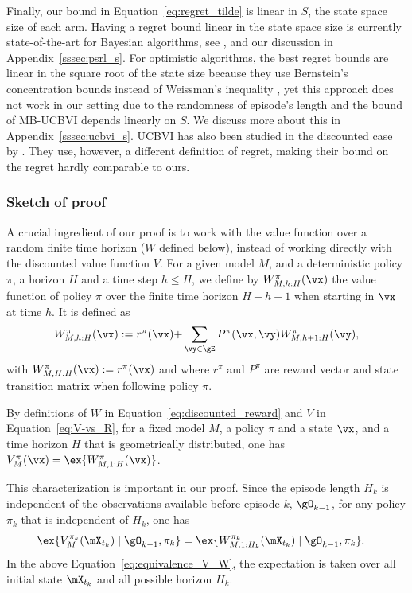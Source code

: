 Finally, our bound in Equation~\eqref{eq:regret_tilde} is linear in $S$, the state space size of each arm. Having a regret bound linear in the state space size is currently state-of-the-art for Bayesian algorithms, see \eg, \cite{agrawal2017posterior,ouyang2017learning} and our discussion in Appendix~\ref{sssec:psrl_s}. For optimistic algorithms, the best regret bounds are linear in the square root of the state size because they use  Bernstein's concentration bounds instead of Weissman's inequality \cite{azar2017minimax}, yet this approach does not work in our setting due to the randomness of episode's length and the bound of MB-UCBVI depends linearly on $S$. We discuss more about this in Appendix~\ref{sssec:ucbvi_s}. UCBVI has also been studied in the discounted case by \cite{zhou2021nearly}. They use, however, a different definition of regret, making their bound on the regret hardly comparable to ours.

\subsubsection*{Sketch of proof}
A crucial ingredient of our proof is to work with the value function over a random finite time horizon ($W$ defined below), instead of working directly with the discounted value function $V$. For a given model $M$, and a deterministic policy $\pi$, a horizon $H$ and a time step $h\le H$, we define by $W_{M,{h:H}}^\pi(\vx)$ the value function of policy $\pi$ over the finite time horizon ${H-h+1}$ when starting in $\vx$ at time $h$. It is defined as
\begin{equation}
    \label{eq:discounted_reward}
    W_{M,{h:H}}^\pi(\vx)  :=  r^\pi(\vx) {+}\sum_{\vy\in\gE}P^\pi(\vx,\vy)W_{M,{h+1:H}}^\pi(\vy),
\end{equation}
with $W_{M,{H:H}}^\pi(\vx):=r^\pi(\vx)$ and where $r^\pi$ and $P^\pi$ are reward vector and state transition matrix when following policy $\pi$.

By definitions of $W$ in Equation~\eqref{eq:discounted_reward} and $V$ in Equation~\eqref{eq:V-vs_R}, for a fixed model $M$, a policy $\pi$ and a state $\vx$, and a time horizon $H$ that is geometrically distributed, one has $V^{\pi}_M(\vx)=\ex{W_{M,1:H}^\pi(\vx)}$.

This characterization is important in our proof. Since the episode length $H_k$ is independent of the observations available before episode $k$, $\gO_{k-1}$, for any policy $\pi_k$ that is independent of $H_k$, one has
\begin{align}
    \ex{V^{\pi_k}_M(\mX_{t_k}) \mid {\gO_{k-1}}, \pi_k } 
    &= \ex{W^{\pi_k}_{M,1:H_k}(\mX_{t_k}) \mid \gO_{k-1}, \pi_k}.
    \label{eq:equivalence_V_W}
\end{align}
In the above Equation~\eqref{eq:equivalence_V_W}, the expectation is taken over all initial state $\mX_{t_k}$ and all possible horizon $H_k$.
    

